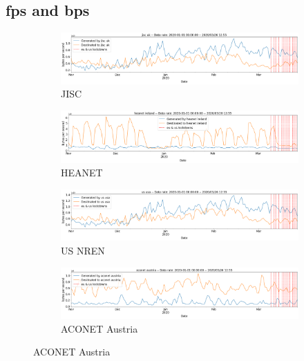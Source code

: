 \documentclass[10pt, journal, letterpaper]{IEEEtran}
\begin{document}
\subsection{fps and bps}
\begin{figure}
    \begin{subfigure}{\textwidth}
          \centering
          \includegraphics[width=\columnwidth]{img/jisc_bps.png}
          \caption{JISC}
          \label{fig:jisc_bps}
    \end{subfigure}
    \begin{subfigure}{\textwidth}
          \centering
          \includegraphics[width=\columnwidth]{img/heanet_bps.png}
          \caption{HEANET}
          \label{fig:HEANET_bps}
    \end{subfigure}
    \begin{subfigure}{\textwidth}
          \centering
          \includegraphics[width=\columnwidth]{img/us_bps.png}
          \caption{US NREN}
          \label{fig:US_bps}
    \end{subfigure}
    \begin{subfigure}{\textwidth}
          \centering
          \includegraphics[width=\columnwidth]{img/aconet_bps.png}
          \caption{ACONET Austria}
          \label{fig:aconet_bps}

\end{subfigure}
\end{figure}
\end{document}
